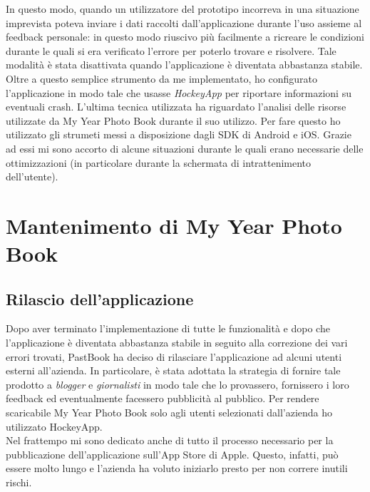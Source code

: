 			In questo modo, quando un utilizzatore del prototipo incorreva in una situazione imprevista poteva inviare i dati raccolti
			dall'applicazione durante l'uso assieme al feedback personale: in questo modo riuscivo più facilmente a ricreare le
			condizioni durante le quali si era verificato l'errore per poterlo trovare e risolvere.	Tale modalità è stata disattivata
			quando l'applicazione è diventata abbastanza stabile. Oltre a questo semplice strumento da me implementato, ho configurato
			l'applicazione in modo tale che usasse \emph{HockeyApp} per riportare informazioni su eventuali crash.
			L'ultima tecnica utilizzata ha riguardato l'analisi delle risorse utilizzate da My Year Photo Book durante il suo utilizzo.
			Per fare questo ho utilizzato gli strumeti messi a disposizione dagli SDK di Android e iOS. Grazie ad essi mi sono accorto di
			alcune situazioni durante le quali erano necessarie delle ottimizzazioni (in particolare durante la schermata di
			intrattenimento dell'utente).
	\section{Mantenimento di My Year Photo Book}
		\subsection{Rilascio dell'applicazione}
			Dopo aver terminato l'implementazione di tutte le funzionalità e dopo che l'applicazione è diventata abbastanza stabile in
			seguito alla correzione dei vari errori trovati, PastBook ha deciso di rilasciare l'applicazione ad alcuni utenti esterni
			all'azienda. In particolare, è stata adottata la strategia di fornire tale prodotto a \emph{blogger} e \emph{giornalisti} in
			modo tale che lo provassero, fornissero i loro feedback ed eventualmente facessero pubblicità al pubblico. Per rendere
			scaricabile My Year Photo Book solo agli utenti selezionati dall'azienda ho utilizzato HockeyApp.\\
			Nel frattempo mi sono dedicato anche di tutto il processo necessario per la pubblicazione dell'applicazione sull'App Store di
			Apple. Questo, infatti, può essere molto lungo e l'azienda ha voluto iniziarlo presto per non correre inutili rischi.

